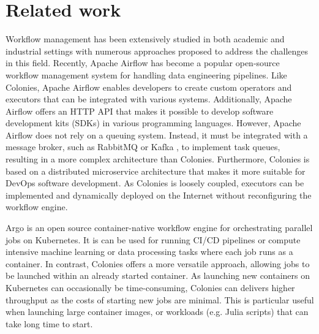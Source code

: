 \documentclass{article}
\begin{document}
\section{Related work}
Workflow management has been extensively studied in both academic and industrial settings with numerous approaches \cite{service_wfs, schmitt2022workflow, GarciaRepresa1740746, Ouyang2010, NIKOLOV2021100440, workflow_in_bigdata} proposed to address the challenges in this field. Recently, Apache Airflow \cite{apache_airflow} has become a popular open-source workflow management system for handling data engineering pipelines. Like Colonies, Apache Airflow enables developers to create custom operators and executors that can be integrated with various systems. Additionally, Apache Airflow offers an HTTP API that makes it possible to develop software development kits (SDKs) in various programming languages. However, Apache Airflow does not rely on a queuing system. Instead, it must be integrated with a message broker, such as RabbitMQ \cite{rabbitmq} or Kafka \cite{apache_kafka}, to implement task queues, resulting in a more complex architecture than Colonies. Furthermore, Colonies is based on a distributed microservice architecture that makes it more suitable for DevOps software development. As Colonies is loosely coupled, executors can be implemented and dynamically deployed on the Internet without reconfiguring the workflow engine.

Argo \cite{argowf} is an open source container-native workflow engine for orchestrating parallel jobs on Kubernetes. It is can be used for running CI/CD pipelines or compute intensive machine learning or data processing tasks where each job runs as a container. In contrast, Colonies offers a more versatile approach, allowing jobs to be launched within an already started container. As launching new containers on Kubernetes can occasionally be time-consuming, Colonies can delivers higher throughput as the costs of starting new jobs are minimal. This is particular useful when launching large container images, or workloads (e.g. Julia scripts) that can take long time to start. 
\end{document}
